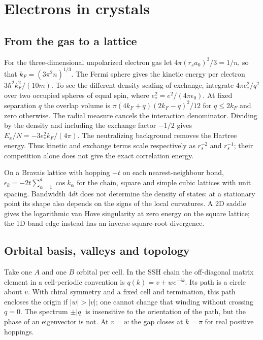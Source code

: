 \chapter{Electrons in crystals}
\section{From the gas to a lattice}
For the three-dimensional unpolarized electron gas let
$4\pi(r_s a_0)^3/3=1/n$, so that $k_F=(3\pi^2 n)^{1/3}$. The Fermi
sphere gives the kinetic energy per electron $3\hbar^2 k_F^2/(10m)$.
To see the different density scaling of exchange, integrate
$4\pi e_*^2/q^2$ over two occupied spheres of equal spin, where
$e_*^2=e^2/(4\pi\epsilon_0)$. At fixed separation $q$ the overlap
volume is $\pi(4k_F+q)(2k_F-q)^2/12$ for $q\le2k_F$ and zero otherwise.
The radial measure cancels the interaction denominator. Dividing by
the density and including the exchange factor $-1/2$ gives
$E_x/N=-3e_*^2 k_F/(4\pi)$. The neutralizing background removes the
Hartree energy. Thus kinetic and exchange terms scale respectively as
$r_s^{-2}$ and $r_s^{-1}$; their competition alone does not give the
exact correlation energy.

On a Bravais lattice with hopping $-t$ on each nearest-neighbour bond,
$\epsilon_k=-2t\sum_{\alpha=1}^{d}\cos k_\alpha$ for the chain,
square and simple cubic lattices with unit spacing. Bandwidth $4dt$
does not determine the density of states: at a stationary point its
shape also depends on the signs of the local curvatures. A 2D saddle
gives the logarithmic van Hove singularity at zero energy on the square
lattice; the 1D band edge instead has an inverse-square-root divergence.

\section{Orbital basis, valleys and topology}
Take one $A$ and one $B$ orbital per cell. In the SSH chain the
off-diagonal matrix element in a cell-periodic convention is
$q(k)=v+w e^{-ik}$. Its path is a circle about $v$. With chiral
symmetry and a fixed cell and termination, this path encloses the
origin if $|w|>|v|$; one cannot change that winding without crossing
$q=0$. The spectrum $\pm|q|$ is insensitive to the orientation of
the path, but the phase of an eigenvector is not. At $v=w$ the gap
closes at $k=\pi$ for real positive hoppings.
